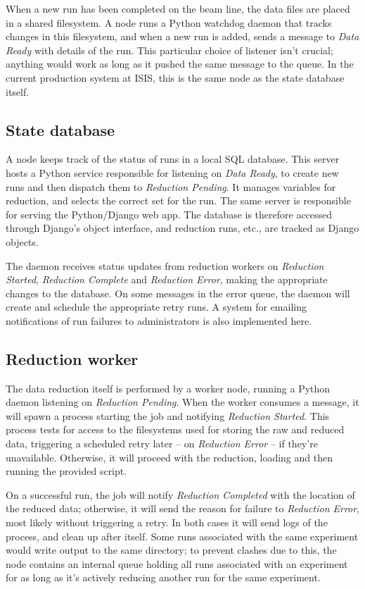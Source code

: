\documentclass[twocolumn]{article}
\begin{document}
When a new run has been completed on the beam line, the data files are
placed in a shared filesystem. A node runs a Python watchdog daemon that
tracks changes in this filesystem, and when a new run is added, sends a
message to \emph{Data Ready} with details of the run. This particular
choice of listener isn't crucial; anything would work as long as it
pushed the same message to the queue. In the current production system
at ISIS, this is the same node as the state database itself.

\subsection{State database}\label{state-database}

A node keeps track of the status of runs in a local SQL database. This
server hosts a Python service responsible for listening on \emph{Data
Ready}, to create new runs and then dispatch them to \emph{Reduction
Pending}. It manages variables for reduction, and selects the correct
set for the run. The same server is responsible for serving the
Python/Django web app. The database is therefore accessed through
Django's object interface, and reduction runs, etc., are tracked as
Django objects.

The daemon receives status updates from reduction workers on
\emph{Reduction Started}, \emph{Reduction Complete} and \emph{Reduction
Error}, making the appropriate changes to the database. On some messages
in the error queue, the daemon will create and schedule the appropriate
retry runs. A system for emailing notifications of run failures to
administrators is also implemented here.

\subsection{Reduction worker}\label{reduction-worker}

The data reduction itself is performed by a worker node, running a
Python daemon listening on \emph{Reduction Pending}. When the worker
consumes a message, it will spawn a process starting the job and
notifying \emph{Reduction Started}. This process tests for access to the
filesystems used for storing the raw and reduced data, triggering a
scheduled retry later -- on \emph{Reduction Error} -- if they're
unavailable. Otherwise, it will proceed with the reduction, loading and
then running the provided script.

On a successful run, the job will notify \emph{Reduction Completed} with
the location of the reduced data; otherwise, it will send the reason for
failure to \emph{Reduction Error}, most likely without triggering a
retry. In both cases it will send logs of the process, and clean up
after itself. Some runs associated with the same experiment would write
output to the same directory; to prevent clashes due to this, the node
contains an internal queue holding all runs associated with an
experiment for as long as it's actively reducing another run for the
same experiment.
\end{document}
